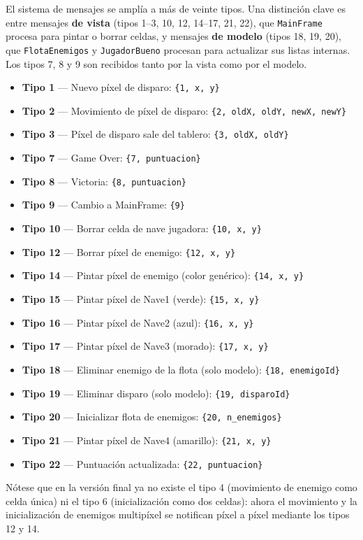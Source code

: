 \documentclass[12pt, a4paper]{article}
\begin{document}
\vspace{0.5em}
 
\begin{cajafinal}
El sistema de mensajes se ampl\'{i}a a m\'{a}s de veinte tipos. Una distinci\'{o}n clave es entre mensajes \textbf{de vista} (tipos 1--3, 10, 12, 14--17, 21, 22), que \texttt{MainFrame} procesa para pintar o borrar celdas, y mensajes \textbf{de modelo} (tipos 18, 19, 20), que \texttt{FlotaEnemigos} y \texttt{JugadorBueno} procesan para actualizar sus listas internas. Los tipos 7, 8 y 9 son recibidos tanto por la vista como por el modelo.
 
\begin{itemize}
    \item \textbf{Tipo 1} --- Nuevo p\'{i}xel de disparo: \texttt{\{1, x, y\}}
    \item \textbf{Tipo 2} --- Movimiento de p\'{i}xel de disparo: \texttt{\{2, oldX, oldY, newX, newY\}}
    \item \textbf{Tipo 3} --- P\'{i}xel de disparo sale del tablero: \texttt{\{3, oldX, oldY\}}
    \item \textbf{Tipo 7} --- Game Over: \texttt{\{7, puntuacion\}}
    \item \textbf{Tipo 8} --- Victoria: \texttt{\{8, puntuacion\}}
    \item \textbf{Tipo 9} --- Cambio a MainFrame: \texttt{\{9\}}
    \item \textbf{Tipo 10} --- Borrar celda de nave jugadora: \texttt{\{10, x, y\}}
    \item \textbf{Tipo 12} --- Borrar p\'{i}xel de enemigo: \texttt{\{12, x, y\}}
    \item \textbf{Tipo 14} --- Pintar p\'{i}xel de enemigo (color gen\'{e}rico): \texttt{\{14, x, y\}}
    \item \textbf{Tipo 15} --- Pintar p\'{i}xel de Nave1 (verde): \texttt{\{15, x, y\}}
    \item \textbf{Tipo 16} --- Pintar p\'{i}xel de Nave2 (azul): \texttt{\{16, x, y\}}
    \item \textbf{Tipo 17} --- Pintar p\'{i}xel de Nave3 (morado): \texttt{\{17, x, y\}}
    \item \textbf{Tipo 18} --- Eliminar enemigo de la flota (solo modelo): \texttt{\{18, enemigoId\}}
    \item \textbf{Tipo 19} --- Eliminar disparo (solo modelo): \texttt{\{19, disparoId\}}
    \item \textbf{Tipo 20} --- Inicializar flota de enemigos: \texttt{\{20, n\_enemigos\}}
    \item \textbf{Tipo 21} --- Pintar p\'{i}xel de Nave4 (amarillo): \texttt{\{21, x, y\}}
    \item \textbf{Tipo 22} --- Puntuaci\'{o}n actualizada: \texttt{\{22, puntuacion\}}
\end{itemize}
 
N\'{o}tese que en la versi\'{o}n final ya no existe el tipo 4 (movimiento de enemigo como celda \'{u}nica) ni el tipo 6 (inicializaci\'{o}n como dos celdas): ahora el movimiento y la inicializaci\'{o}n de enemigos multip\'{i}xel se notifican p\'{i}xel a p\'{i}xel mediante los tipos 12 y 14.
\end{cajafinal}
 
\end{document}

